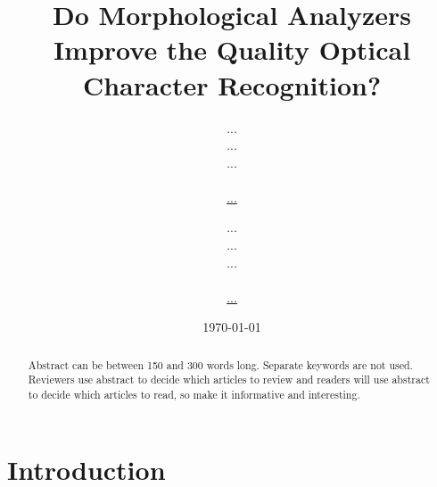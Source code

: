 \documentclass[b5paper]{article}
\begin{document}
\title{Do Morphological Analyzers Improve the Quality Optical Character Recognition?}


\author{...\\
...\\
...\\
\\
\url{...} \and
...\\
...\\
...\\
\\
\url{...} 
}
\date{\today}

\maketitle

\begin{abstract}
    Abstract can be between 150 and 300 words long. Separate keywords are not
    used. Reviewers use abstract to decide which articles to review and readers
    will use abstract to decide which articles to read, so make it informative
    and interesting.
\end{abstract}

\section{Introduction}
\end{document}
